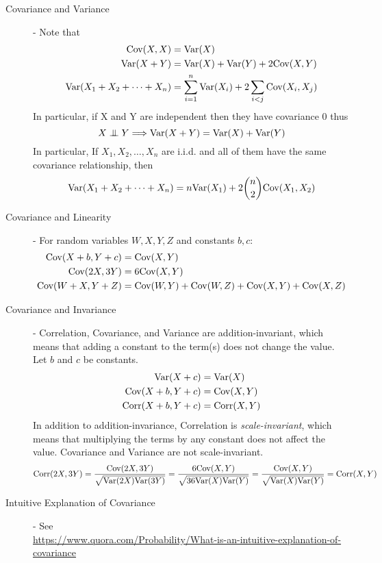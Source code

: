 \documentclass[11.5pt]{article}
\begin{document}
\begin{notes}
\begin{description}
\item [Covariance and Variance] - Note that
	\begin{align*}
		\textrm{Cov}(X, X) &= \textrm{Var}(X) \\
		\textrm{Var}(X + Y) &= \textrm{Var}(X) + \textrm{Var}(Y) + 2\textrm{Cov}(X, Y) \\
		\textrm{Var}(X_1 + X_2 + \dots + X_n ) &= \sum_{i = 1}^{n}\textrm{Var}(X_i) + 2\sum_{i < j} \textrm{Cov}(X_i, X_j)
	\end{align*}
	In particular, if X and Y are independent then they have covariance 0 thus
	\[X \independent Y \Longrightarrow \var(X + Y) = \var(X) + \var(Y)\]
	In particular, If $X_1, X_2, \dots, X_n$ are i.i.d. and all of them have the same covariance relationship, then 
	\[\textrm{Var}(X_1 + X_2 + \dots + X_n ) = n\textrm{Var}(X_1) + 2{n \choose 2}\textrm{Cov}(X_1, X_2)\]
	
\item [Covariance and Linearity] - For random variables $W, X, Y, Z$ and constants $b, c$:
	\begin{align*}
		\textrm{Cov}(X + b, Y + c) &= \textrm{Cov}(X, Y) \\
		\textrm{Cov}(2X, 3Y) &= 6\textrm{Cov}(X, Y) \\
		\textrm{Cov}(W + X, Y + Z) &= \textrm{Cov}(W, Y) + \textrm{Cov}(W, Z) + \textrm{Cov}(X, Y) + \textrm{Cov}(X, Z)
	\end{align*}
\item [Covariance and Invariance] - Correlation, Covariance, and Variance are addition-invariant, which means that adding a constant to the term(s) does not change the value. Let $b$ and $c$ be constants.
	\begin{align*}
		\textrm{Var}(X + c) &= \textrm{Var}(X) \\
		\textrm{Cov}(X + b, Y + c) &= \textrm{Cov}(X, Y) \\
		\textrm{Corr}(X + b, Y + c) &= \textrm{Corr}(X, Y) 
	\end{align*}
	In addition to addition-invariance, Correlation is \emph{scale-invariant}, which means that multiplying the terms by any constant does not affect the value. Covariance and Variance are not scale-invariant.
	\[\textrm{Corr}(2X, 3Y) = \frac{\textrm{Cov}(2X, 3Y)}{\sqrt{\textrm{Var}(2X)\textrm{Var}(3Y)}} = \frac{6\textrm{Cov}(X, Y)}{\sqrt{36\textrm{Var}(X)\textrm{Var}(Y)}} = \frac{\textrm{Cov}(X, Y)}{\sqrt{\textrm{Var}(X)\textrm{Var}(Y)}} = \textrm{Corr}(X, Y)\]
\item[Intuitive Explanation of Covariance] - See \\
\url{https://www.quora.com/Probability/What-is-an-intuitive-explanation-of-covariance}
\end{description}

\end{notes}
\end{document}
